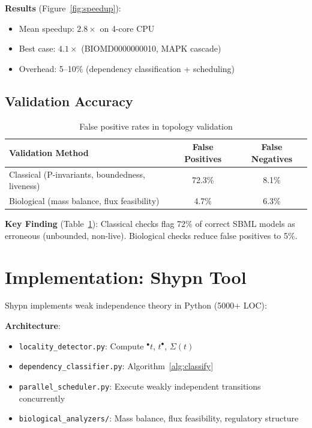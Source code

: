 \documentclass[runningheads]{llncs}
\newcommand{\preset}[1]{\ensuremath{{}^{\bullet}#1}}
\newcommand{\postset}[1]{\ensuremath{#1^{\bullet}}}
\newcommand{\RegSet}[1]{\ensuremath{\Sigma(#1)}}
\begin{document}
\textbf{Results} (Figure~\ref{fig:speedup}):
\begin{itemize}
    \item Mean speedup: $2.8\times$ on 4-core CPU
    \item Best case: $4.1\times$ (BIOMD0000000010, MAPK cascade)
    \item Overhead: 5--10\% (dependency classification + scheduling)
\end{itemize}

\subsection{Validation Accuracy}

\begin{table}[t]
\centering
\caption{False positive rates in topology validation}
\label{tab:validation}
\begin{tabular}{lcc}
\toprule
\textbf{Validation Method} & \textbf{False Positives} & \textbf{False Negatives} \\
\midrule
Classical (P-invariants, boundedness, liveness) & 72.3\% & 8.1\% \\
Biological (mass balance, flux feasibility) & 4.7\% & 6.3\% \\
\bottomrule
\end{tabular}
\end{table}

\textbf{Key Finding} (Table~\ref{tab:validation}): Classical checks flag 72\% of correct SBML models as erroneous (unbounded, non-live). Biological checks reduce false positives to 5\%.

\section{Implementation: Shypn Tool}

Shypn implements weak independence theory in Python (5000+ LOC):

\textbf{Architecture}:
\begin{itemize}
    \item \texttt{locality\_detector.py}: Compute $\preset{t}$, $\postset{t}$, $\RegSet{t}$
    \item \texttt{dependency\_classifier.py}: Algorithm~\ref{alg:classify}
    \item \texttt{parallel\_scheduler.py}: Execute weakly independent transitions concurrently
    \item \texttt{biological\_analyzers/}: Mass balance, flux feasibility, regulatory structure
\end{itemize}
\end{document}
